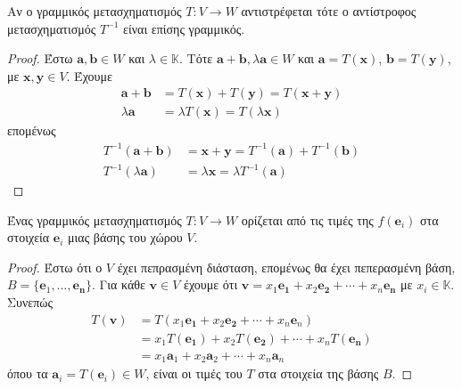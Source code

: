 \begin{prop}
  Αν ο γραμμικός μετασχηματισμός $ T \colon V \to W $ αντιστρέφεται τότε ο αντίστροφος 
  μετασχηματισμός $ T^{-1} $ είναι επίσης γραμμικός.
\end{prop}
\begin{proof}
  Έστω $ \mathbf{a}, \mathbf{b} \in W $ και $ \lambda \in \mathbb{K} $. Τότε 
  $ \mathbf{a} + \mathbf{b}, \lambda \mathbf{a} \in W $ και 
  $ \mathbf{a}= T(\mathbf{x}) $, $ \mathbf{b} = T(\mathbf{y}) $, με 
  $ \mathbf{x}, \mathbf{y} \in V $. Έχουμε
  \begin{align*}
    \mathbf{a}+ \mathbf{b} &= T(\mathbf{x}) + T(\mathbf{y}) = T(\mathbf{x}+ \mathbf{y})\\
    \lambda \mathbf{a} &= \lambda T(\mathbf{x}) = T(\lambda \mathbf{x})
  \end{align*}
  επομένως
  \begin{align*}
    T^{-1} (\mathbf{a}+ \mathbf{b}) &= \mathbf{x} + \mathbf{y} = T^{-1} (\mathbf{a}) 
    + T^{-1} (\mathbf{b}) \\
    T^{-1} (\lambda \mathbf{a}) &= \lambda \mathbf{x} = \lambda T^{-1} (\mathbf{a})
   \end{align*} 
\end{proof}

\begin{prop}
  Ένας γραμμικός μετασχηματισμός $ T \colon V \to W $ ορίζεται από τις τιμές της 
  $ f(\mathbf{e}_{i}) $ στα στοιχεία $ \mathbf{e}_{i} $ μιας βάσης του χώρου $V$.
\end{prop}
\begin{proof}
  Έστω ότι ο $V$ έχει πεπρασμένη διάσταση, επομένως θα έχει πεπερασμένη βάση, 
  $ B = \{ \mathbf{e}_{1}, \ldots, \mathbf{e_{n}} \} $. 
  Για κάθε $ \mathbf{v} \in V $ έχουμε ότι 
  $ \mathbf{v}= x_{1} \mathbf{e_{1}} + x_{2} \mathbf{e_{2}} +  
  \cdots + x_{n} \mathbf{e_{n}} $ με $ x_{i} \in \mathbb{K} $. Συνεπώς
  \begin{align*}
    T(\mathbf{v}) & = T(x_{1} \mathbf{e_{1}}+ x_{2} \mathbf{e_{2}}+ \cdots + x_{n}
    \mathbf{e}_{n}) \\ 
                  &= x_{1}T(\mathbf{e_{1}}) + x_{2}T(\mathbf{e_{2}}) + \cdots + x_{n} 
                  T(\mathbf{e_{n}}) \\ 
                  &= x_{1} \mathbf{a}_{1} + x_{2} \mathbf{a}_{2} + \cdots + x_{n} 
                  \mathbf{a}_{n}
  \end{align*}
  όπου τα $ \mathbf{a}_{i} = T(\mathbf{e}_{i}) \in W $, είναι οι τιμές του $T$ στα 
  στοιχεία της βάσης $B$.
\end{proof}

